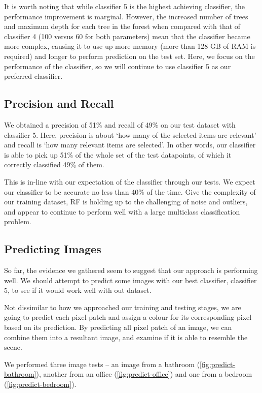 It is worth noting that while classifier 5 is the highest achieving classifier, the performance improvement is marginal. However, the increased number of trees and maximum depth for each tree in the forest when compared with that of classifier 4 (100 versus 60 for both parameters) mean that the classifier became more complex, causing it to use up more memory (more than 128 GB of RAM is required) and longer to perform prediction on the test set. Here, we focus on the performance of the classifier, so we will continue to use classifier 5 as our preferred classifier.


\newpage
\subsection*{Precision and Recall}


We obtained a precision of 51\% and recall of 49\% on our test dataset with classifier 5. Here, precision is about `how many of the selected items are relevant' and recall is `how many relevant items are selected'. In other words, our classifier is able to pick up 51\% of the whole set of the test datapoints, of which it correctly classified 49\% of them.

This is in-line with our expectation of the classifier through our tests. We expect our classifier to be accurate no less than 40\% of the time. Give the complexity of our training dataset, RF is holding up to the challenging of noise and outliers, and appear to continue to perform well with a large multiclass classification problem.

\subsection*{Predicting Images}
So far, the evidence we gathered seem to suggest that our approach is performing well. We should attempt to predict some images with our best classifier, classifier 5, to see if it would work well with out dataset.

Not dissimilar to how we approached our training and testing stages, we are going to predict each pixel patch and assign a colour for its corresponding pixel based on its prediction. By predicting all pixel patch of an image, we can combine them into a resultant image, and examine if it is able to resemble the scene. 

We performed three image tests -- an image from a bathroom (\autoref{fig:predict-bathroom}), another from an office (\autoref{fig:predict-office}) and one from a bedroom (\autoref{fig:predict-bedroom}).

